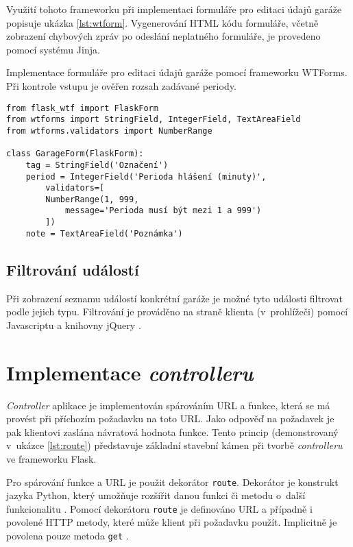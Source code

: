 Využití tohoto frameworku při implementaci formuláře pro editaci údajů garáže popisuje ukázka \ref{lst:wtform}. Vygenerování HTML kódu formuláře, včetně zobrazení chybových zpráv po odeslání neplatného formuláře, je provedeno pomocí systému Jinja.

\begin{listing}[htbp]
\caption{\label{lst:wtform} Implementace formuláře pro editaci údajů garáže pomocí frameworku WTForms. Při kontrole vstupu je ověřen rozsah zadávané periody.}
\begin{verbatim}
from flask_wtf import FlaskForm
from wtforms import StringField, IntegerField, TextAreaField
from wtforms.validators import NumberRange

class GarageForm(FlaskForm):
    tag = StringField('Označení')
    period = IntegerField('Perioda hlášení (minuty)', 
        validators=[
        NumberRange(1, 999, 
            message='Perioda musí být mezi 1 a 999')
        ])
    note = TextAreaField('Poznámka')
\end{verbatim}
\end{listing}

\subsection{Filtrování událostí}

Při zobrazení seznamu událostí konkrétní garáže je možné tyto události filtrovat podle jejich typu. Filtrování je prováděno na straně klienta (v~prohlížeči) pomocí Javascriptu a knihovny jQuery \cite{jquery_about}.

\section{Implementace \textit{controlleru}}
\label{sec:im_controller}

\textit{Controller} aplikace je implementován spárováním URL a funkce, která se má provést při příchozím požadavku na toto URL. Jako odpověď na požadavek je pak klientovi zaslána návratová hodnota funkce. Tento princip (demonstrovaný v~ukázce \ref{lst:route}) představuje základní stavební kámen při tvorbě \textit{controlleru} ve frameworku Flask.

Pro spárování funkce a URL je použit dekorátor \texttt{route}. Dekorátor je konstrukt jazyka Python, který umožňuje rozšířit danou funkci či metodu o~další funkcionalitu \cite{python_decorators}. Pomocí dekorátoru \texttt{route} je definováno URL a případně i povolené HTTP metody, které může klient při požadavku použít. Implicitně je povolena pouze metoda \texttt{get} \cite{flask_api}. 

